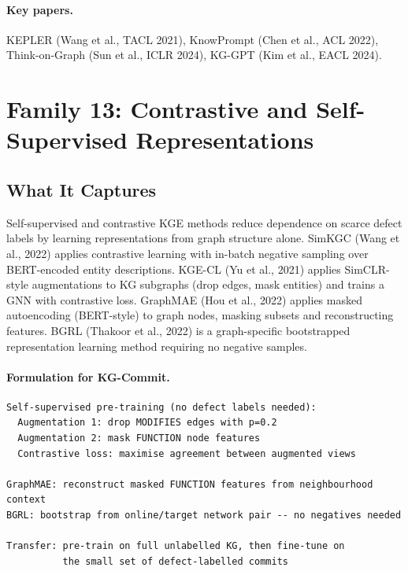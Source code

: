 \documentclass[12pt,a4paper]{article}
\begin{document}
\paragraph{Key papers.} KEPLER (Wang et al., TACL 2021), KnowPrompt (Chen et al.,
ACL 2022), Think-on-Graph (Sun et al., ICLR 2024), KG-GPT (Kim et al.,
EACL 2024).

\section{Family 13: Contrastive and Self-Supervised Representations}

\subsection{What It Captures}

Self-supervised and contrastive KGE methods reduce dependence on scarce defect
labels by learning representations from graph structure alone. SimKGC (Wang et al.,
2022) applies contrastive learning with in-batch negative sampling over
BERT-encoded entity descriptions. KGE-CL (Yu et al., 2021) applies SimCLR-style
augmentations to KG subgraphs (drop edges, mask entities) and trains a GNN with
contrastive loss. GraphMAE (Hou et al., 2022) applies masked autoencoding
(BERT-style) to graph nodes, masking subsets and reconstructing features.
BGRL (Thakoor et al., 2022) is a graph-specific bootstrapped representation
learning method requiring no negative samples.

\paragraph{Formulation for KG-Commit.}
\begin{lstlisting}
Self-supervised pre-training (no defect labels needed):
  Augmentation 1: drop MODIFIES edges with p=0.2
  Augmentation 2: mask FUNCTION node features
  Contrastive loss: maximise agreement between augmented views

GraphMAE: reconstruct masked FUNCTION features from neighbourhood context
BGRL: bootstrap from online/target network pair -- no negatives needed

Transfer: pre-train on full unlabelled KG, then fine-tune on
          the small set of defect-labelled commits
\end{lstlisting}
\end{document}
